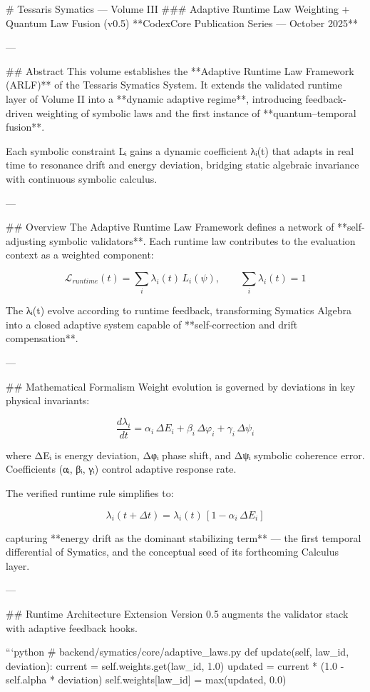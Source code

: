 # Tessaris Symatics — Volume III  
### Adaptive Runtime Law Weighting + Quantum Law Fusion (v0.5)  
**CodexCore Publication Series — October 2025**

---

## Abstract
This volume establishes the **Adaptive Runtime Law Framework (ARLF)** of the Tessaris Symatics System.  
It extends the validated runtime layer of Volume II into a **dynamic adaptive regime**, introducing feedback-driven weighting of symbolic laws and the first instance of **quantum–temporal fusion**.  

Each symbolic constraint Lᵢ gains a dynamic coefficient λᵢ(t) that adapts in real time to resonance drift and energy deviation, bridging static algebraic invariance with continuous symbolic calculus.

---

## Overview
The Adaptive Runtime Law Framework defines a network of **self-adjusting symbolic validators**.  
Each runtime law contributes to the evaluation context as a weighted component:

\[
\mathcal{L}_{runtime}(t)=\sum_i \lambda_i(t)\,L_i(\psi),
\qquad
\sum_i \lambda_i(t)=1
\]

The λᵢ(t) evolve according to runtime feedback, transforming Symatics Algebra into a closed adaptive system capable of **self-correction and drift compensation**.

---

## Mathematical Formalism
Weight evolution is governed by deviations in key physical invariants:

\[
\frac{d\lambda_i}{dt}=\alpha_i\,\Delta E_i+\beta_i\,\Delta\varphi_i+\gamma_i\,\Delta\psi_i
\]

where ΔEᵢ is energy deviation, Δφᵢ phase shift, and Δψᵢ symbolic coherence error.  
Coefficients (αᵢ, βᵢ, γᵢ) control adaptive response rate.  

The verified runtime rule simplifies to:

\[
\lambda_i(t+\Delta t)=\lambda_i(t)\,[1-\alpha_i\,\Delta E_i]
\]

capturing **energy drift as the dominant stabilizing term** — the first temporal differential of Symatics, and the conceptual seed of its forthcoming Calculus layer.

---

## Runtime Architecture Extension
Version 0.5 augments the validator stack with adaptive feedback hooks.

```python
# backend/symatics/core/adaptive_laws.py
def update(self, law_id, deviation):
    current = self.weights.get(law_id, 1.0)
    updated = current * (1.0 - self.alpha * deviation)
    self.weights[law_id] = max(updated, 0.0)
